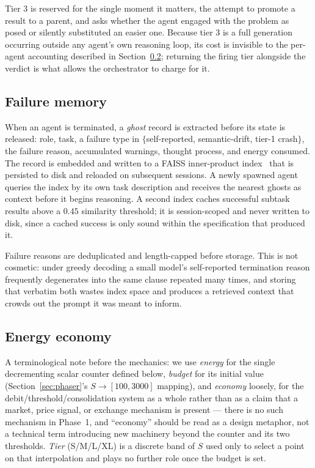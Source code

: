 \documentclass[11pt]{article}
\begin{document}
Tier 3 is reserved for the single moment it matters, the attempt to promote a
result to a parent, and asks whether the agent engaged with the problem as
posed or silently substituted an easier one. Because tier 3 is a full
generation occurring outside any agent's own reasoning loop, its cost is
invisible to the per-agent accounting described in Section~\ref{sec:energy};
returning the firing tier alongside the verdict is what allows the orchestrator
to charge for it.

\subsection{Failure memory}
\label{sec:ghosts}

When an agent is terminated, a \emph{ghost} record is extracted before its
state is released: role, task, a failure type in $\{$self-reported,
semantic-drift, tier-1 crash$\}$, the failure reason, accumulated warnings,
thought process, and energy consumed. The record is embedded and written to a
FAISS inner-product index~\cite{johnson2017faiss} that is persisted to disk and
reloaded on subsequent sessions. A newly spawned agent queries the index by its
own task description and receives the nearest ghosts as context before it
begins reasoning. A second index caches successful subtask results above a
$0.45$ similarity threshold; it is session-scoped and never written to disk,
since a cached success is only sound within the specification that produced it.

Failure reasons are deduplicated and length-capped before storage. This is not
cosmetic: under greedy decoding a small model's self-reported termination
reason frequently degenerates into the same clause repeated many times, and
storing that verbatim both wastes index space and produces a retrieved context
that crowds out the prompt it was meant to inform.

\subsection{Energy economy}
\label{sec:energy}

A terminological note before the mechanics: we use \emph{energy} for the
single decrementing scalar counter defined below, \emph{budget} for its
initial value (Section~\ref{sec:phaser}'s $S \to [100,3000]$ mapping), and
\emph{economy} loosely, for the debit/threshold/consolidation system as a
whole rather than as a claim that a market, price signal, or exchange
mechanism is present --- there is no such mechanism in Phase~1, and
``economy'' should be read as a design metaphor, not a technical term
introducing new machinery beyond the counter and its two thresholds.
\emph{Tier} (S/M/L/XL) is a discrete band of $S$ used only to select a point
on that interpolation and plays no further role once the budget is set.
\end{document}
